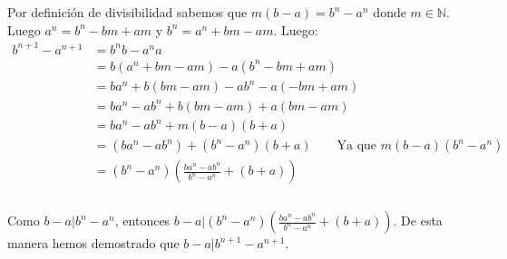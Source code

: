 \documentclass{report}
\begin{document}
    \noindent Por definición de divisibilidad sabemos que $ m(b-a) = b^n - a^n $ donde $m \in \mathbb{N}$. Luego $a^n = b^n -bm + am$ y $b^n = a^n + bm -am$. Luego:
    \noindent \begin{align*}
        b^{n+1} - a^{n+1} &= b^nb - a^na \\
        &= b(a^n + bm - am) - a(b^n -bm +am) \\
        &= ba^n + b(bm -am) - ab^n -a(-bm+am) \\
        &= ba^n - ab^n + b(bm -am) + a(bm-am) \\
        &= ba^n - ab^n + m(b-a)(b+a) \\
        &= (ba^n-ab^n)+(b^n-a^n)(b+a) \qquad \text{Ya que $m(b-a)(b^n -a^n)$} \\
        &= (b^n-a^n)(\frac{ba^n-ab^n}{b^n-a^n}+ (b+a)) \\
    \end{align*}\\

    \noindent Como $b - a| b^n - a^n$, entonces $b-a| (b^n-a^n)(\frac{ba^n-ab^n}{b^n-a^n}+ (b+a))$. De esta manera hemos demostrado que $b - a| b^{n+1} - a^{n+1}$.
\end{document}
